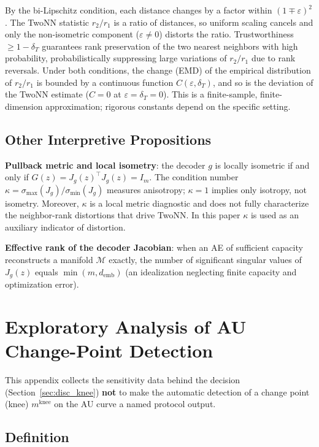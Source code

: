 \documentclass[make,article,submit,pdftex,moreauthors]{Definitions/mdpi}
\newcommand{\Jg}{J_g}
\newcommand{\kap}{\kappa}
\newcommand{\demb}{d_{\mathrm{emb}}}
\newcommand{\mknee}{m^{\mathrm{knee}}}
\begin{document}
By the bi-Lipschitz condition, each distance changes by a factor within
$(1 \mp \varepsilon)^2$.
The TwoNN statistic $r_2/r_1$ is a ratio of distances, so uniform scaling
cancels and only the non-isometric component ($\varepsilon \neq 0$) distorts
the ratio.
Trustworthiness $\geq 1 - \delta_T$ guarantees rank preservation of the two
nearest neighbors with high probability, probabilistically suppressing large
variations of $r_2/r_1$ due to rank reversals.
Under both conditions, the change (EMD) of the empirical distribution of
$r_2/r_1$ is bounded by a continuous function $C(\varepsilon, \delta_T)$,
and so is the deviation of the TwoNN estimate
($C = 0$ at $\varepsilon = \delta_T = 0$).
This is a finite-sample, finite-dimension approximation; rigorous constants
depend on the specific setting.

\subsection[\appendixname~\thesubsection]{Other Interpretive Propositions}

\textbf{Pullback metric and local isometry}:
the decoder $g$ is locally isometric if and only if
$G(z) = \Jg(z)^\top \Jg(z) = I_m$.
The condition number $\kap = \sigma_{\max}(\Jg)/\sigma_{\min}(\Jg)$ measures
anisotropy; $\kap = 1$ implies only isotropy, not isometry.
Moreover, $\kap$ is a local metric diagnostic and does not fully
characterize the neighbor-rank distortions that drive TwoNN.
In this paper $\kap$ is used as an auxiliary indicator of distortion.

\textbf{Effective rank of the decoder Jacobian}:
when an AE of sufficient capacity reconstructs a manifold $\mathcal{M}$
exactly, the number of significant singular values of $\Jg(z)$ equals
$\min(m, \demb)$ (an idealization neglecting finite capacity and
optimization error).

\section[\appendixname~\thesection]{Exploratory Analysis of AU Change-Point Detection}\label{app:knee}

This appendix collects the sensitivity data behind the decision
(Section~\ref{sec:disc_knee}) \textbf{not} to make the automatic detection
of a change point (knee) $\mknee$ on the AU curve a named protocol output.

\subsection[\appendixname~\thesubsection]{Definition}
\end{document}

